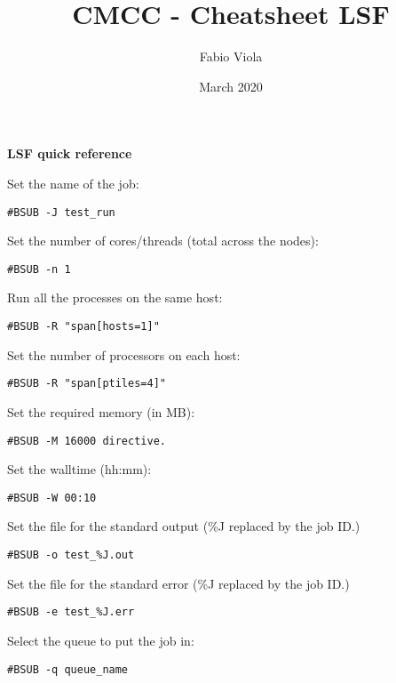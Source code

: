 \documentclass[twocolumn,8pt]{article}
\title{CMCC - Cheatsheet LSF}
\author{Fabio Viola}
\date{March 2020}
\begin{document}

\LARGE \textbf{LSF quick reference} \normalsize  

\begin{mdframed}[frametitle=\#BSUB directives]

Set the name of the job:
\begin{lstlisting}
#BSUB -J test_run
\end{lstlisting}

Set the number of cores/threads (total across the nodes):
\begin{lstlisting}
#BSUB -n 1
\end{lstlisting}

Run all the processes on the same host:
\begin{lstlisting}
#BSUB -R "span[hosts=1]"
\end{lstlisting}

Set the number of processors on each host:
\begin{lstlisting}
#BSUB -R "span[ptiles=4]"
\end{lstlisting}

Set the required memory (in MB):
\begin{lstlisting}
#BSUB -M 16000 directive.
\end{lstlisting}

Set the walltime (hh:mm):
\begin{lstlisting}
#BSUB -W 00:10
\end{lstlisting}

Set the file for the standard output (\%J replaced by the job ID.)
\begin{lstlisting}
#BSUB -o test_%J.out
\end{lstlisting}

Set the file for the standard error (\%J replaced by the job ID.)
\begin{lstlisting}
#BSUB -e test_%J.err
\end{lstlisting}

Select the queue to put the job in:
\begin{lstlisting}
#BSUB -q queue_name
\end{lstlisting}
\end{mdframed}
\end{document}
